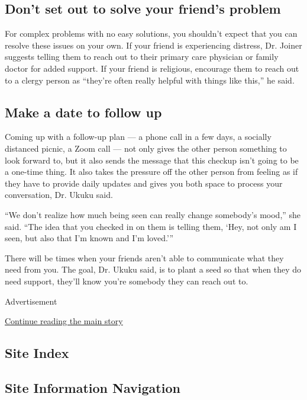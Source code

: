 \hypertarget{dont-set-out-to-solve-your-friends-problem}{%
\subsection{Don't set out to solve your friend's
problem}\label{dont-set-out-to-solve-your-friends-problem}}

For complex problems with no easy solutions, you shouldn't expect that
you can resolve these issues on your own. If your friend is experiencing
distress, Dr. Joiner suggests telling them to reach out to their primary
care physician or family doctor for added support. If your friend is
religious, encourage them to reach out to a clergy person as ``they're
often really helpful with things like this,'' he said.

\hypertarget{make-a-date-to-follow-up}{%
\subsection{Make a date to follow up}\label{make-a-date-to-follow-up}}

Coming up with a follow-up plan --- a phone call in a few days, a
socially distanced picnic, a Zoom call --- not only gives the other
person something to look forward to, but it also sends the message that
this checkup isn't going to be a one-time thing. It also takes the
pressure off the other person from feeling as if they have to provide
daily updates and gives you both space to process your conversation, Dr.
Ukuku said.

``We don't realize how much being seen can really change somebody's
mood,'' she said. ``The idea that you checked in on them is telling
them, `Hey, not only am I seen, but also that I'm known and I'm
loved.'''

There will be times when your friends aren't able to communicate what
they need from you. The goal, Dr. Ukuku said, is to plant a seed so that
when they do need support, they'll know you're somebody they can reach
out to.

Advertisement

\protect\hyperlink{after-bottom}{Continue reading the main story}

\hypertarget{site-index}{%
\subsection{Site Index}\label{site-index}}

\hypertarget{site-information-navigation}{%
\subsection{Site Information
Navigation}\label{site-information-navigation}}

